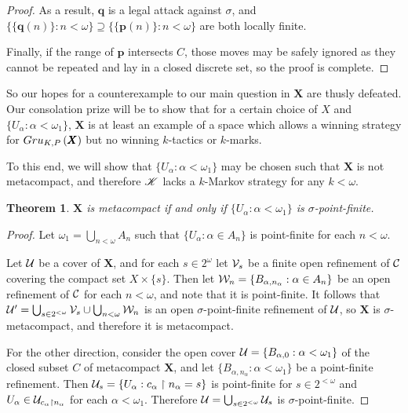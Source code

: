 \documentclass{amsart}
\newtheorem{theorem}{Theorem}[section]
\theoremstyle{definition}
\begin{document}
\begin{proof}
  As a result, $\pmb q$ is a legal attack against $\sigma$, and
  $\{\{\pmb q(n)\}:n<\omega\}\supseteq\{\{\pmb p(n)\}:n<\omega\}$ are
  both locally finite.

  Finally, if the range of $\pmb p$ intersects $C$, those moves may be safely
  ignored as they cannot be repeated and lay in a closed discrete set,
  so the proof is complete.
\end{proof}

So our hopes for a counterexample to our main question
in $\pmb X$ are thusly defeated. Our
consolation prize will be to show that for a certain choice of $X$
and $\{U_\alpha:\alpha<\omega_1\}$, $\pmb X$ is at least
an example of a space which allows a winning strategy for $Gru_{K,P}\left({\pmb X}\right)$
but no winning $k$-tactics or $k$-marks.

To this end, we will show that $\{U_\alpha:\alpha<\omega_1\}$ may be chosen
such that $\pmb X$ is not metacompact, and therefore
$\mathscr{K}$ lacks a $k$-Markov strategy for any $k<\omega$.

\begin{theorem}
  $\pmb X$ is metacompact
    if and only if
  $\{U_\alpha:\alpha<\omega_1\}$ is $\sigma$-point-finite.
\end{theorem}

\begin{proof}
  Let $\omega_1=\bigcup_{n<\omega}A_n$ such that
  $\{U_\alpha:\alpha\in A_n\}$ is point-finite for each $n<\omega$.

  Let $\mathcal{U}$ be a cover of $\pmb X$, and for each $s\in 2^\omega$
  let $\mathcal{V}_s$ be a finite open refinement of $\mathcal{C}$ covering the compact
  set $X\times\{s\}$. Then let $\mathcal{W}_n = \{B_{\alpha,n_\alpha}:\alpha\in A_n\}$
  be an open refinement of $\mathcal{C}$ for each $n<\omega$, and note that it
  is point-finite. It follows that
  $\mathcal{U}' = \bigcup_{s\in 2^{<\omega}} \mathcal{V}_s \cup \bigcup_{n<\omega} \mathcal{W}_n$
  is an open $\sigma$-point-finite refinement of $\mathcal{U}$, so $\pmb X$
  is $\sigma$-metacompact, and therefore it is metacompact.

  For the other direction, consider the open cover
  $\mathcal{U} = \{B_{\alpha,0}:\alpha<\omega_1\}$ of the closed subset $C$ of
  metacompact $\pmb X$, and let $\{B_{\alpha,n_\alpha}:\alpha<\omega_1\}$ be
  a point-finite refinement. Then
  $\mathcal{U}_s = \{ U_\alpha : c_\alpha \restriction n_\alpha = s\}$ is
  point-finite for $s\in 2^{<\omega}$ and
  $U_\alpha\in\mathcal{U}_{c_\alpha\restriction n_\alpha}$ for each $\alpha<\omega_1$.
  Therefore $\mathcal{U} = \bigcup_{s\in 2^{<\omega}} \mathcal{U}_s$ is
  $\sigma$-point-finite.
\end{proof}
\end{document}
